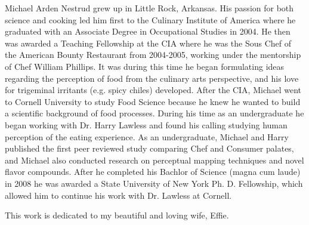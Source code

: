 \documentclass[phd,tocprelim]{cornell}
\begin{document}
\begin{biosketch}
Michael Arden Nestrud grew up in Little Rock, Arkansas.  His passion for both science and cooking led him first to the Culinary Institute of America where he graduated with an Associate Degree in Occupational Studies in 2004.  He then was awarded a Teaching Fellowship at the CIA where he was the Sous Chef of the American Bounty Restaurant from 2004-2005, working under the mentorship of Chef William Phillips.  It was during this time he began formulating ideas regarding the perception of food from the culinary arts perspective, and his love for trigeminal irritants (e.g. spicy chiles) developed.  After the CIA, Michael went to Cornell University to study Food Science because he knew he wanted to build a scientific background of food processes.  During his time as an undergraduate he began working with Dr. Harry Lawless and found his calling studying human perception of the eating experience.  As an undergraduate, Michael and Harry published the first peer reviewed study comparing Chef and Consumer palates, and Michael also conducted research on perceptual mapping techniques and novel flavor compounds.  After he completed his Bachlor of Science (magna cum laude) in 2008 he was awarded a State University of New York Ph. D. Fellowship, which allowed him to continue his work with Dr. Lawless at Cornell.  

\end{biosketch}
\begin{dedication}
This work is dedicated to my beautiful and loving wife, Effie.
\end{dedication}
\end{document}
